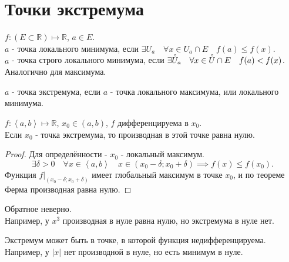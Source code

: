 \documentclass[11pt, oneside]{article}   	%
\begin{document}
    \section{Точки экстремума}
    \begin{definition}
       $f: (E \subset \mathbb{R}) \mapsto \mathbb{R}$, $a\in E$. \\
       $a$ - точка локального минимума, если $\exists{U_a}\quad \forall{x\in U_a\cap E}\quad f(a) \le f(x)$.\\
       $a$ - точка строго локального минимума, если $\exists{\accentset{\circ}{U}_a}\quad \forall{x\in \accentset{\circ}{U}\cap E}\quad f(a) < f(x)$.
       Аналогично для максимума.\\
    \end{definition}
    \begin{definition}
       $a$ - точка экстремума, если $a$ - точка локального максимума, или локального минимума.
    \end{definition}
    \begin{theorem}
       $f: \left<a, b\right> \mapsto \mathbb{R}$, $x_0\in (a, b)$, $f$ дифференцируема в  $x_0$.\\
       Если $x_0$ - точка экстремума, то производная в этой точке равна нулю.\\
       \begin{proof}
           Для определённости - $x_0$ - локальный максимум.\\
           \[ \exists{\delta > 0}\quad \forall{x\in \left<a, b\right>}\quad x\in (x_0-\delta; x_0+\delta) \implies f(x) \le f(x_0) .\]
           Функция $\left.f\right|_{(x_0-\delta; x_0+\delta)}$ имеет глобальный максимум в точке $x_0$, и по теореме Ферма производная равна нулю.
       \end{proof}
    \end{theorem}
    \begin{tlemma}
        Обратное неверно.\\
        Например, у $x^{3}$ производная в нуле равна нулю, но экстремума в нуле нет.
    \end{tlemma}
    \begin{tlemma}
        Экстремум может быть в точке, в которой функция недифференцируема.
        Например, у $|x|$ нет производной в нуле, но есть минимум в нуле.
    \end{tlemma}
\end{document}
